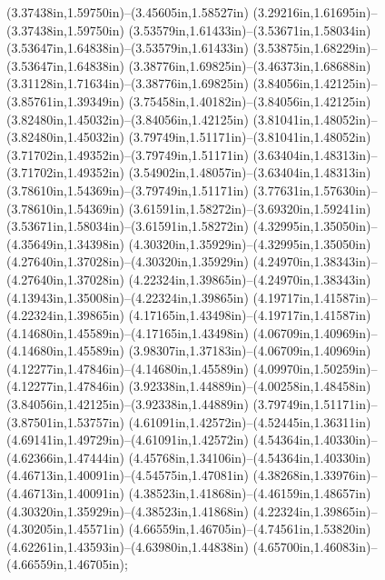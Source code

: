 (3.37438in,1.59750in)--(3.45605in,1.58527in) (3.29216in,1.61695in)--(3.37438in,1.59750in) (3.53579in,1.61433in)--(3.53671in,1.58034in) (3.53647in,1.64838in)--(3.53579in,1.61433in) (3.53875in,1.68229in)--(3.53647in,1.64838in) (3.38776in,1.69825in)--(3.46373in,1.68688in) (3.31128in,1.71634in)--(3.38776in,1.69825in) (3.84056in,1.42125in)--(3.85761in,1.39349in) (3.75458in,1.40182in)--(3.84056in,1.42125in) (3.82480in,1.45032in)--(3.84056in,1.42125in) (3.81041in,1.48052in)--(3.82480in,1.45032in) (3.79749in,1.51171in)--(3.81041in,1.48052in) (3.71702in,1.49352in)--(3.79749in,1.51171in) (3.63404in,1.48313in)--(3.71702in,1.49352in) (3.54902in,1.48057in)--(3.63404in,1.48313in) (3.78610in,1.54369in)--(3.79749in,1.51171in) (3.77631in,1.57630in)--(3.78610in,1.54369in) (3.61591in,1.58272in)--(3.69320in,1.59241in) (3.53671in,1.58034in)--(3.61591in,1.58272in) (4.32995in,1.35050in)--(4.35649in,1.34398in) (4.30320in,1.35929in)--(4.32995in,1.35050in) (4.27640in,1.37028in)--(4.30320in,1.35929in) (4.24970in,1.38343in)--(4.27640in,1.37028in) (4.22324in,1.39865in)--(4.24970in,1.38343in) (4.13943in,1.35008in)--(4.22324in,1.39865in) (4.19717in,1.41587in)--(4.22324in,1.39865in) (4.17165in,1.43498in)--(4.19717in,1.41587in) (4.14680in,1.45589in)--(4.17165in,1.43498in) (4.06709in,1.40969in)--(4.14680in,1.45589in) (3.98307in,1.37183in)--(4.06709in,1.40969in) (4.12277in,1.47846in)--(4.14680in,1.45589in) (4.09970in,1.50259in)--(4.12277in,1.47846in) (3.92338in,1.44889in)--(4.00258in,1.48458in) (3.84056in,1.42125in)--(3.92338in,1.44889in) (3.79749in,1.51171in)--(3.87501in,1.53757in) (4.61091in,1.42572in)--(4.52445in,1.36311in) (4.69141in,1.49729in)--(4.61091in,1.42572in) (4.54364in,1.40330in)--(4.62366in,1.47444in) (4.45768in,1.34106in)--(4.54364in,1.40330in) (4.46713in,1.40091in)--(4.54575in,1.47081in) (4.38268in,1.33976in)--(4.46713in,1.40091in) (4.38523in,1.41868in)--(4.46159in,1.48657in) (4.30320in,1.35929in)--(4.38523in,1.41868in) (4.22324in,1.39865in)--(4.30205in,1.45571in) (4.66559in,1.46705in)--(4.74561in,1.53820in) (4.62261in,1.43593in)--(4.63980in,1.44838in) (4.65700in,1.46083in)--(4.66559in,1.46705in);
